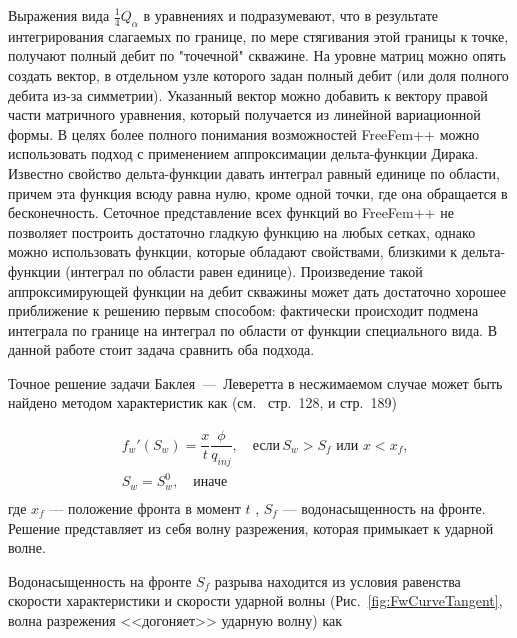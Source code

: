 Выражения вида $\frac{1}{4}Q_{\alpha}$ в уравнениях  и  подразумевают,
что в результате интегрирования слагаемых по границе, по мере стягивания этой границы к точке, получают полный дебит по "точечной" скважине.
На уровне матриц можно опять создать вектор, в отдельном узле которого задан полный дебит (или доля полного дебита из-за симметрии).
Указанный вектор можно добавить к вектору правой части матричного уравнения, который получается из линейной вариационной формы.
В целях более полного понимания возможностей FreeFem++ можно использовать подход с применением аппроксимации дельта-функции Дирака. 
Известно свойство дельта-функции давать интеграл равный единице по области, причем эта функция всюду равна нулю, кроме одной точки, 
где она обращается в бесконечность. Сеточное представление всех функций во FreeFem++ не позволяет построить достаточно гладкую функцию 
на любых сетках, однако можно использовать функции, которые обладают свойствами, близкими к дельта-функции (интеграл по области равен
единице). Произведение такой аппроксимирующей функции на дебит скважины может дать достаточно хорошее приближение к решению первым
способом: фактически происходит подмена интеграла по границе на интеграл по области от функции специального вида. В данной работе
стоит задача сравнить оба подхода.


Точное решение задачи Баклея~---~Леверетта в несжимаемом случае может быть найдено методом характеристик как (см.~\cite{Barenblatt_Entov_Ryzhik_1984} стр.~128, и \cite{Collins_1984} стр.~189)

\begin{equation}\label{exactSol_test}
	\begin{split}
		& f_w'(S_w) = \dfrac{x}{t} \dfrac{\phi}{q_{inj}}, \quad \text{если}\, S_w > S_f \text{ или } x < x_f, \\
		 & S_w=S_w^0, \quad \text{иначе} \\
	\end{split}
	\end{equation}
	где $x_f$ --- положение фронта в момент $t$ , $S_f$ --- водонасыщенность на фронте.
Решение представляет из себя волну разрежения, которая примыкает к ударной волне.

Водонасыщенность на фронте $S_f$ разрыва находится из условия равенства скорости характеристики и скорости ударной волны (Рис.~\ref{fig:FwCurveTangent}, волна разрежения <<догоняет>> ударную волну) как

